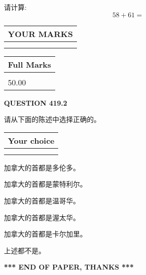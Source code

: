 \documentclass{ctexart}
\begin{document}
  
 
请计算:
\begin{equation}
58 +  %
61 = \nonumber
\end{equation}
 

 

 
  
\vspace{0.2in}
  
\noindent\begin{tabular}{|l|}
\hline
 YOUR MARKS  \\
\hline
 \\ 
 \\ 
\hline
\end{tabular}
\hspace{0.05in} \begin{tabular}{|l|}
\hline
 Full Marks  \\
\hline
 \\ 
50.00 \\
\hline
\end{tabular}
{\textbf{\Large{QUESTION
419.2 
}}}
  
  
请从下面的陈述中选择正确的。
  
  
\noindent\hspace{3.0in} \begin{tabular}{|l|}
\hline
Your choice \\
\hline
 \\ 
 \\ 
\hline
\end{tabular}
  
  
 
 
加拿大的首都是多伦多。
 
 
加拿大的首都是蒙特利尔。
 
 
加拿大的首都是温哥华。
 
 
加拿大的首都是渥太华。
 
 
加拿大的首都是卡尔加里。
 
 
 上述都不是。
 
 
   
   
 \vspace{0.2in}
 
   
   
   
   
\vspace{1.0in} 
{\textbf{\large{ *** END OF PAPER, THANKS *** }}} 
   
\end{document}
